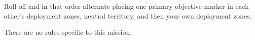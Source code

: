 
\begin{tablesetup}

  \vanguardstrike

  \smallskip%
  Roll off and in that order alternate placing one primary objective
  marker in each other's deployment zones, neutral territory, and then
  your own deployment zones.

\end{tablesetup}

\begin{missionrules}

\bigskip
There are no rules specific to this mission.

\end{missionrules}

